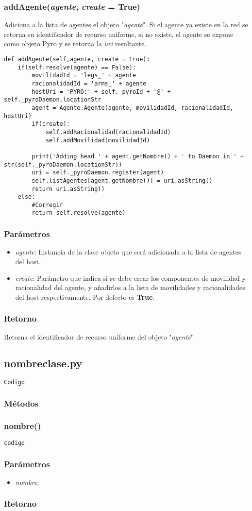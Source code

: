 \documentclass{article}
\begin{document}
\subsubsection{\textbf{addAgente}(\textit{agente}, \textit{create} = \textbf{True})}
Adiciona a la lista de agentes el objeto "\textit{agente}". Si el agente ya existe en la red se retorna su identificador de recurso uniforme, si no existe, el agente se expone como objeto Pyro y se retorna la \textit{uri} resultante.
\begin{lstlisting}
def addAgente(self,agente, create = True):
	if(self.resolve(agente) == False):
		movilidadId = 'legs_' + agente
		racionalidadId = 'arms_' + agente
		hostUri = 'PYRO:' + self._pyroId + '@' + self._pyroDaemon.locationStr
		agent = Agente.Agente(agente, movilidadId, racionalidadId, hostUri)
		if(create):
			self.addRacionalidad(racionalidadId)
			self.addMovilidad(movilidadId)

		print('Adding head ' + agent.getNombre() + ' to Daemon in ' + str(self._pyroDaemon.locationStr))
		uri = self._pyroDaemon.register(agent)
		self.listAgentes[agent.getNombre()] = uri.asString()
		return uri.asString()
	else:
		#Corregir
		return self.resolve(agente)
\end{lstlisting}
\subsubsection*{Parámetros}
\begin{itemize}
\item \textit{agente}: Instancia de la clase objeto que será adicionada a la lista de agentes del host.
\item \textit{create}: Parámetro que indica si se debe crear los componentes de movilidad y racionalidad del agente, y añadirlos a la lista de movilidades y racionalidades del host respectivamente. Por defecto es \textbf{True}.
\end{itemize}
\subsubsection*{Retorno}
Retorna el identificador de recurso uniforme del objeto "\textit{agente}"

\subsection{nombreclase.py}
\begin{lstlisting}
Codigo
\end{lstlisting}
\subsubsection*{Métodos}
\subsubsection{\textbf{nombre}()}
\begin{lstlisting}
codigo
\end{lstlisting}
\subsubsection*{Parámetros}
\begin{itemize}
\item \textit{nombre}: 
\end{itemize}
\subsubsection*{Retorno}
\end{document}
